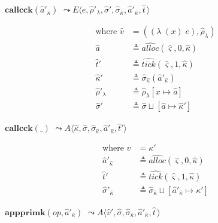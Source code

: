 \documentclass[12pt,draft]{article}
\newcommand{\singlelamsyn}[2]{(\lambda\;(#1)\;#2)}
\begin{document}
\begin{multicols*}{2}
\vfill\null
\columnbreak


\begin{center}
  $\textbf{callcck}(\hat{a}'_{\hat{\kappa}})$
  $\leadsto E\langle e , \hat{\rho}'_{\lambda} , \hat{\sigma}' , \hat{\sigma}_{\hat{\kappa}} , \hat{a}'_{\hat{\kappa}} , \hat{t}\,\rangle$
\end{center}
\vspace{-7mm}
\begin{align*}
  \text{where }
  \hat{v} &= (\singlelamsyn{x}{e} , \hat{\rho}_{\lambda}) \\
  \hat{a} &\triangleq \widehat{alloc}(\hat{\varsigma}, 0, \hat{\kappa}) \\
  \hat{t}' &\triangleq \widehat{tick}(\hat{\varsigma}, 1, \hat{\kappa}) \\
  \hat{\kappa}' &\triangleq \hat{\sigma}_{\hat{\kappa}}(\hat{a}'_{\hat{\kappa}}) \\
  \hat{\rho}'_{\lambda} &\triangleq \hat{\rho}_{\lambda}[x \mapsto \hat{a}] \\
  \hat{\sigma}' &\triangleq \hat{\sigma} \sqcup [\hat{a} \mapsto \hat{\kappa}']
\end{align*}
\begin{center}
  $\textbf{callcck}(\_)$
  $\leadsto A\langle \hat{\kappa} , \hat{\sigma} , \hat{\sigma}_{\hat{\kappa}} , \hat{a}'_{\hat\kappa}  , \hat{t}'\rangle$
\end{center}
\vspace{-7mm}
\begin{align*}
\text{where } v &= \kappa' \\
  \hat{a}'_{\hat\kappa} &\triangleq \widehat{alloc}(\hat{\varsigma}, 0, \hat{\kappa}) \\
  \hat{t}' &\triangleq \widehat{tick}(\hat{\varsigma}, 1, \hat{\kappa}) \\
  \hat{\sigma}'_{\hat{\kappa}} &\triangleq \hat{\sigma}_{\hat{\kappa}} \sqcup [\hat{a}'_{\hat{\kappa}} \mapsto \kappa']
\end{align*}
\begin{center}
  $\textbf{appprimk}(op, \hat{a}'_{\hat{\kappa}})$
  $\leadsto A\langle \hat{v}' , \hat{\sigma} , \hat{\sigma}_{\hat{\kappa}} , \hat{a}'_{\hat{\kappa}} , \hat{t}\,\rangle$

\end{center}
\end{multicols*}
\end{document}
